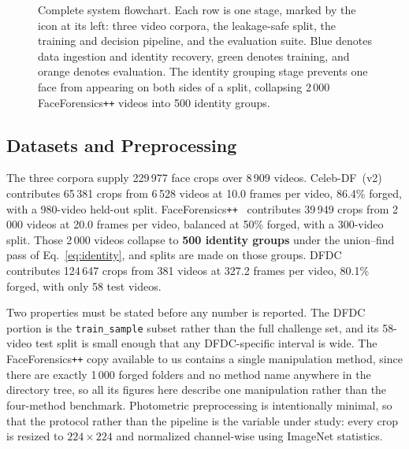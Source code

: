 \documentclass[journal,onecolumn]{IEEEtran}
\newcommand{\celebdf}{Celeb-DF}
\newcommand{\dfdc}{DFDC}
\begin{document}
\begin{figure}[!ht]
{}
\caption{Complete system flowchart. Each row is one stage, marked by the
icon at its left: three video corpora, the leakage-safe split, the training
and decision pipeline, and the evaluation suite. Blue denotes data ingestion
and identity recovery, green denotes training, and orange denotes evaluation.
The identity grouping stage prevents one face from appearing on both sides of
a split, collapsing 2\,000 FaceForensics\texttt{++} videos into 500 identity
groups.}
\label{fig:flowchart}
\end{figure}

\subsection{Datasets and Preprocessing}

The three corpora supply 229\,977 face crops over 8\,909 videos.
\celebdf{}~(v2)~\cite{li2020celebdf} contributes 65\,381 crops from 6\,528 videos
at 10.0 frames per video, 86.4\% forged, with a 980-video held-out split.
FaceForensics\texttt{++}~\cite{rossler2019faceforensics} contributes 39\,949
crops from 2\,000 videos at 20.0 frames per video, balanced at 50\% forged, with
a 300-video split. Those 2\,000 videos collapse to \textbf{500 identity groups}
under the union--find pass of Eq.~\eqref{eq:identity}, and splits are made on
those groups. \dfdc{}~\cite{dolhansky2020dfdc} contributes 124\,647 crops from
381 videos at 327.2 frames per video, 80.1\% forged, with only 58 test videos.

Two properties must be stated before any number is reported. The \dfdc{} portion
is the \texttt{train\_sample} subset rather than the full challenge set, and its
58-video test split is small enough that any \dfdc{}-specific interval is wide.
The FaceForensics\texttt{++} copy available to us contains a single manipulation
method, since there are exactly 1\,000 forged folders and no method name anywhere
in the directory tree, so all its figures here describe one manipulation rather
than the four-method benchmark. Photometric preprocessing is intentionally
minimal, so that the protocol rather than the pipeline is the variable under
study: every crop is resized to $224 \times 224$ and normalized channel-wise
using ImageNet statistics.
\end{document}
